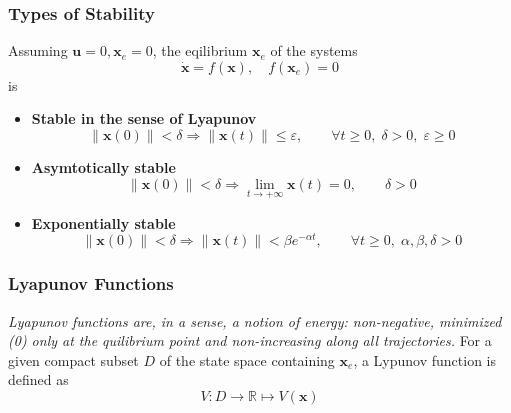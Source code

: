 \subsubsection{Types of Stability}
Assuming $\mathbf{u}=0, \mathbf{x}_e=0$, the eqilibrium $\mathbf{x}_e$ of the systems
\noindent\begin{equation*}
    \dot{\mathbf{x}} = f(\mathbf{x}), \quad f(\mathbf{x}_e) = 0
\end{equation*}
is
\begin{itemize}
    \item \textbf{Stable in the sense of Lyapunov}
          \noindent\begin{equation*}
              \|\mathbf{x}(0)\| < \delta \Rightarrow \|\mathbf{x}(t)\| \leq \varepsilon,\qquad \forall t\geq 0,\; \delta > 0,\; \varepsilon\geq0
          \end{equation*}
    \item \textbf{Asymtotically stable}
          \noindent\begin{equation*}
              \|\mathbf{x}(0)\| < \delta \Rightarrow \lim_{t\to +\infty} \mathbf{x}(t)=0, \qquad \delta>0
          \end{equation*}
    \item \textbf{Exponentially stable}
          \noindent\begin{equation*}
              \|\mathbf{x}(0)\| < \delta \Rightarrow \|\mathbf{x}(t)\| < \beta e^{-\alpha t}, \qquad \forall t\geq 0,\; \alpha, \beta, \delta >0
          \end{equation*}
\end{itemize}

\subsubsection{Lyapunov Functions}
\textit{Lyapunov functions are, in a sense, a notion of energy: non-negative, minimized (0) only at the quilibrium point and non-increasing along all trajectories.}
\newpar{}
For a given compact subset $D$ of the state space containing $\mathbf{x}_e$, a Lypunov function is defined as
\noindent\begin{equation*}
    V:D \to \mathbb{R} \mapsto V(\mathbf{x})
\end{equation*}

